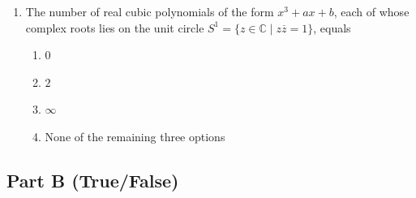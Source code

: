 \documentclass[11pt, a4paper]{article}
\begin{document}
\begin{enumerate}
  \item The number of real cubic polynomials of the form $x^3 + ax + b$, each of whose complex roots lies on the unit circle $S^1 = \{z \in \mathbb{C} \mid z \overline{z} = 1\}$, equals
  \begin{enumerate}[label=(\alph*)]
    \item $0$
    \item $2$
    \item $\infty$
    \item None of the remaining three options
  \end{enumerate}
\end{enumerate}

\subsection*{Part B (True/False)}
\end{document}
